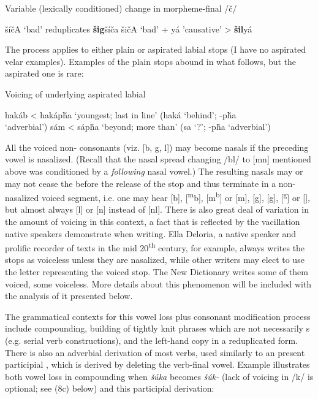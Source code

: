\documentclass[output=paper]{LSP/langsci}
\begin{document}
\begin{exe}
\ex\label{ex:rood:5}
Variable (lexically conditioned) change in morpheme-final /\v{c}/
\begin{xlist}
\ex \v{s}í\v{c}A `bad' reduplicates \textbf{\v{s}ig}\v{s}í\v{c}a
\ex \v{s}i\v{c}A `bad' + yá 'causative' > \textbf{\v{s}il}yá
\end{xlist}
\end{exe}

The process applies to either plain or aspirated labial stops (I have no aspirated velar examples). Examples of the plain stops abound in what follows, but the aspirated one is rare:

\begin{exe}
\ex \label{ex:rood:6}
Voicing of underlying aspirated labial
\begin{xlist}
\ex hakáb < hakáp\v{h}a `youngest; last in line' (haká `behind'; -p\v{h}a \\ `adverbial')
\ex sám < sáp\v{h}a `beyond; more than' (sa `?'; -p\v{h}a  `adverbial')
\end{xlist}
\end{exe}

All the voiced non- consonants (viz. [b, g, l]) may become nasals if the preceding vowel is nasalized. (Recall that the nasal spread changing /bl/ to [mn] mentioned above was conditioned by a \textit{following} nasal vowel.) The resulting nasals may or may not cease the  before the release of the stop and thus terminate in a non-nasalized voiced segment, i.e. one may hear [b], [\textsuperscript{m}b], [m\textsuperscript{b}] or [m], [g], [\textsuperscript{}g], [\textsuperscript{g}] or [], but almost always [l] or [n] instead of [nl]. There is also great deal of variation in the amount of voicing in this context, a fact that is reflected by the vacillation native speakers demonstrate when writing. Ella Deloria, a native speaker and prolific recorder of  texts in the mid 20\textsuperscript{th} century, for example, always writes the stops as voiceless unless they are nasalized, while other writers may elect to use the letter representing the voiced stop. The New  Dictionary writes some of them voiced, some voiceless. More details about this phenomenon will be included with the analysis of it presented below.

The grammatical contexts for this vowel loss plus consonant modification process include compounding, building of tightly knit phrases which are not necessarily s (e.g. serial verb constructions), and the left-hand copy in a reduplicated form. There is also an adverbial derivation of most verbs, used similarly to an  present participial , which is derived by deleting the verb-final vowel. Example  illustrates both vowel loss in compounding when \textit{\v{s}úka} becomes \textit{\v{s}úk-} (lack of voicing in /k/ is optional; see (8c) below) and this participial derivation:
\end{document}
